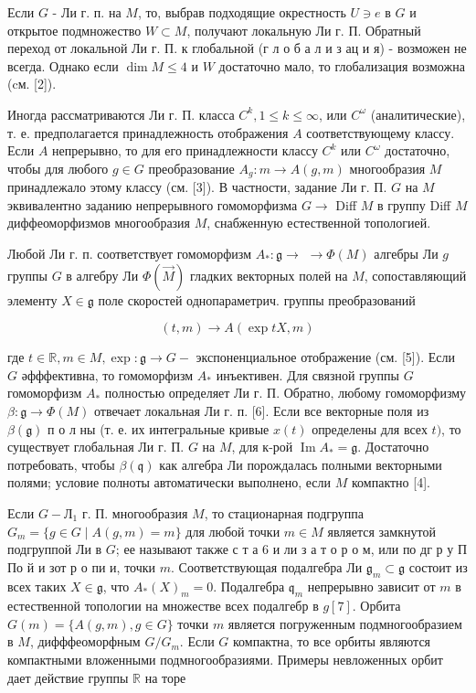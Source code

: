 \documentclass[10pt]{article}
\begin{document}
Если $G$ - Ли г. п. на $M$, то, выбрав подходящие окрестность $U \ni e$ в $G$ и открытое подмножество $W \subset M$, получают локальную Ли г. П. Обратный переход от локальной Ли г. П. к глобальной (г л о б а л и з ац и я) - возможен не всегда. Однако если $\operatorname{dim} M \leqslant 4$ и $W$ достаточно мало, то глобализация возможна (cм. [2]).



Иногда рассматриваются Ли г. П. класса $C^{k}, 1 \leqslant k \leqslant \infty$, или $C^{\omega}$ (аналитические), т. е. предполагается принадлежность отображения $A$ соответствующему классу. Если $A$ непрерывно, то для его принадлежности классу $C^{k}$ или $C^{\omega}$ достаточно, чтобы для любого $g \in G$ преобразование $A_{g}: m \rightarrow A(g, m)$ многообразия $M$ принадлежало этому классу (см. [3]). В частности, задание Ли г. П. $G$ на $M$ эквивалентно заданию непрерывного гомоморфизма $G \rightarrow$ Diff $M$ в группу Diff $M$ диффеоморфизмов многообразия $M$, снабженную естественной топологией.



Любой Ли г. п. соответствует гомоморфизм $A_{*}: \mathfrak{g} \rightarrow$ $\rightarrow \Phi(M)$ алгебры Ли $g$ группы $G$ в алгебру Ли $\Phi(\vec{M})$ гладких векторных полей на $M$, сопоставляющий элементу $X \in \mathfrak{g}$ поле скоростей однопараметрич. группы преобразований



\[

(t, m) \rightarrow A(\exp t X, m)

\]



где $t \in \mathbb{R}, m \in M, \exp : \mathfrak{g} \rightarrow G-$ экспоненциальное отображение (см. [5]). Если $G$ әфффективна, то гомоморфизм $A_{*}$ инъективен. Для связной группы $G$ гомоморфизм $A_{*}$ полностью определяет Ли г. П. Обратно, любому гомоморфизму $\beta: \mathfrak{g} \rightarrow \Phi(M)$ отвечает локальная Ли г. п. [6]. Если все векторные поля из $\beta(\mathfrak{g})$ п о л ны (т. е. их интегральные кривые $x(t)$ определены для всех $t)$, то существует глобальная Ли г. П. $G$ на $M$, для к-рой $\operatorname{Im} A_{*}=\mathfrak{g}$. Достаточно потребовать, чтобы $\beta(\mathfrak{q})$ как алгебра Ли порождалась полными векторными полями; условие полноты автоматически выполнено, если $M$ компактно [4].



Если $G-Л_{1}$ г. П. многообразия $M$, то стационарная подгруппа $G_{m}=\{g \in G \mid A(g, m)=m\}$ для любой точки $m \in M$ является замкнутой подгруппой Ли в $G$; ее называют также с т а 6 и ли з а т о р о м, или по дг р у П По й и зот р о пи и, точки $m$. Соответствующая подалгебра Ли $\mathfrak{g}_{m} \subset \mathfrak{g}$ состоит из всех таких $X \in \mathfrak{g}$, что $A_{*}(X)_{m}=0$. Подалгебра $\mathfrak{q}_{m}$ непрерывно зависит от $m$ в естественной топологии на множестве всех подалгебр в $g[7]$. Орбита $G(m)=\{A(g, m), g \in G\}$ точки $m$ является погруженным подмногообразием в $M$, дифффеоморфным $G / G_{m}$. Если $G$ компактна, то все орбиты являются компактными вложенными подмногообразиями. Примеры невложенных орбит дает действие группы $\mathbb{R}$ на торе
\end{document}
